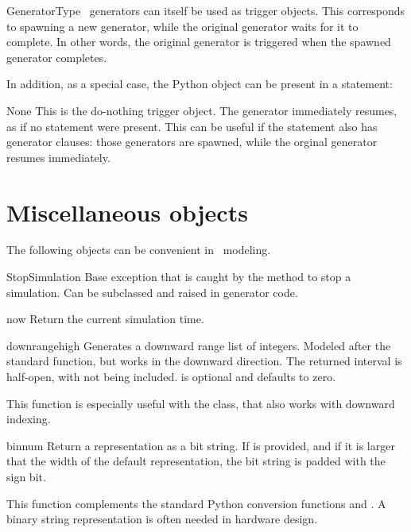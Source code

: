 \begin{datadesc}{GeneratorType}
\myhdl\ generators can itself be used as trigger objects. 
This corresponds to spawning a new generator, while the original
generator waits for it to complete.  In other words, the original
generator is triggered when the spawned generator completes.
\end{datadesc}

In addition, as a special case, the Python  object can be
present in  a  statement:

\begin{datadesc}{None}
This is the do-nothing trigger object. The generator immediately
resumes, as if no  statement were present. This can be
useful if the  statement also has generator clauses: those
generators are spawned, while the orginal generator resumes
immediately.

\end{datadesc}



\section{Miscellaneous objects}

The following objects can be convenient in \myhdl\ modeling.

\begin{excclassdesc}{StopSimulation}{}
Base exception that is caught by the  method to
stop a simulation. Can be subclassed and raised in generator code.
\end{excclassdesc}

\begin{funcdesc}{now}{}
Return the current simulation time.
\end{funcdesc}

\begin{funcdesc}{downrange}{high }
Generates a downward range list of integers. Modeled after the
standard  function, but works in the downward
direction. The returned interval is half-open, with  not
being included.  is optional and defaults to zero.

This function is especially useful with the  class, that
also works with downward indexing.
\end{funcdesc}

\begin{funcdesc}{bin}{num }
Return a representation as a bit string.  If  is provided,
and if it is larger that the width of the default representation, the
bit string is padded with the sign bit.

This function complements the standard Python conversion functions
 and . A binary string representation is often
needed in hardware design.
\end{funcdesc}


